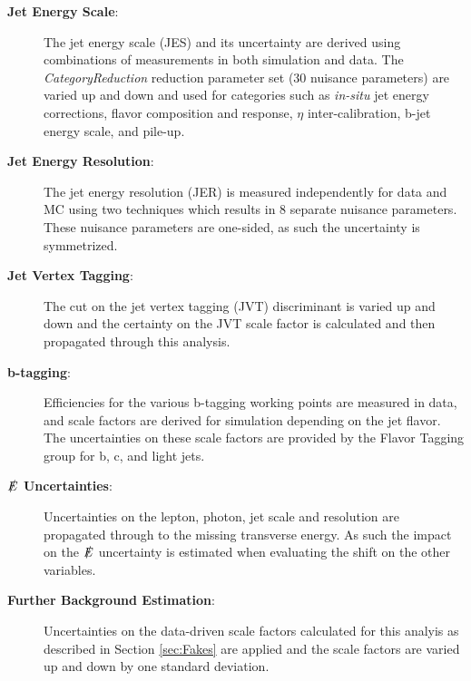 \begin{description}
\item[\textbf{Jet Energy Scale}:] The jet energy scale (JES) and its uncertainty are derived using combinations of measurements in both simulation and data.  The \textit{CategoryReduction} reduction parameter set (30 nuisance parameters) are varied up and down and used for categories such as \textit{in-situ} jet energy corrections, flavor composition and response, $\eta$ inter-calibration, b-jet energy scale, and pile-up.

\item[\textbf{Jet Energy Resolution}:] The jet energy resolution (JER) is measured independently for data and MC using two techniques \cite{ATL-PHYS-PUB-2015-015} which results in 8 separate nuisance parameters.  These nuisance parameters are one-sided, as such the uncertainty is symmetrized.


\item[\textbf{Jet Vertex Tagging}:]  The cut on the jet vertex tagging (JVT) discriminant is varied up and down \cite{JetJVT} and the certainty on the JVT scale factor is calculated and then propagated through this analysis.

\item[\textbf{b-tagging}:]  Efficiencies for the various b-tagging working points are measured in data, and scale factors are derived for simulation depending on the jet flavor.  The uncertainties on these scale factors are provided by the Flavor Tagging group for b, c, and light jets.

\item[\textbf{$\slashed{E}$ Uncertainties}:]  Uncertainties on the lepton, photon, jet scale and resolution are propagated through to the missing transverse energy.  As such the impact on the $\slashed{E}$ uncertainty is estimated when evaluating the shift on the other variables.

\item[\textbf{Further Background Estimation}:] Uncertainties on the data-driven scale factors calculated for this analyis as described in Section \ref{sec:Fakes} are applied and the scale factors are varied up and down by one standard deviation.

\end{description}

